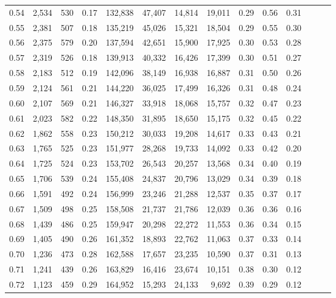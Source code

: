 \begin{tabular}{rrrrrrrrrrrrrr}
0.54 &  2,534 &    530 &  0.17 &  132,838 &   47,407 &  14,814 &  19,011 &  0.29 &  0.56 &      0.31 \\
0.55 &  2,381 &    507 &  0.18 &  135,219 &   45,026 &  15,321 &  18,504 &  0.29 &  0.55 &      0.30 \\
0.56 &  2,375 &    579 &  0.20 &  137,594 &   42,651 &  15,900 &  17,925 &  0.30 &  0.53 &      0.28 \\
0.57 &  2,319 &    526 &  0.18 &  139,913 &   40,332 &  16,426 &  17,399 &  0.30 &  0.51 &      0.27 \\
0.58 &  2,183 &    512 &  0.19 &  142,096 &   38,149 &  16,938 &  16,887 &  0.31 &  0.50 &      0.26 \\
0.59 &  2,124 &    561 &  0.21 &  144,220 &   36,025 &  17,499 &  16,326 &  0.31 &  0.48 &      0.24 \\
0.60 &  2,107 &    569 &  0.21 &  146,327 &   33,918 &  18,068 &  15,757 &  0.32 &  0.47 &      0.23 \\
0.61 &  2,023 &    582 &  0.22 &  148,350 &   31,895 &  18,650 &  15,175 &  0.32 &  0.45 &      0.22 \\
0.62 &  1,862 &    558 &  0.23 &  150,212 &   30,033 &  19,208 &  14,617 &  0.33 &  0.43 &      0.21 \\
0.63 &  1,765 &    525 &  0.23 &  151,977 &   28,268 &  19,733 &  14,092 &  0.33 &  0.42 &      0.20 \\
0.64 &  1,725 &    524 &  0.23 &  153,702 &   26,543 &  20,257 &  13,568 &  0.34 &  0.40 &      0.19 \\
0.65 &  1,706 &    539 &  0.24 &  155,408 &   24,837 &  20,796 &  13,029 &  0.34 &  0.39 &      0.18 \\
0.66 &  1,591 &    492 &  0.24 &  156,999 &   23,246 &  21,288 &  12,537 &  0.35 &  0.37 &      0.17 \\
0.67 &  1,509 &    498 &  0.25 &  158,508 &   21,737 &  21,786 &  12,039 &  0.36 &  0.36 &      0.16 \\
0.68 &  1,439 &    486 &  0.25 &  159,947 &   20,298 &  22,272 &  11,553 &  0.36 &  0.34 &      0.15 \\
0.69 &  1,405 &    490 &  0.26 &  161,352 &   18,893 &  22,762 &  11,063 &  0.37 &  0.33 &      0.14 \\
0.70 &  1,236 &    473 &  0.28 &  162,588 &   17,657 &  23,235 &  10,590 &  0.37 &  0.31 &      0.13 \\
0.71 &  1,241 &    439 &  0.26 &  163,829 &   16,416 &  23,674 &  10,151 &  0.38 &  0.30 &      0.12 \\
0.72 &  1,123 &    459 &  0.29 &  164,952 &   15,293 &  24,133 &   9,692 &  0.39 &  0.29 &      0.12 \\

\end{tabular}
